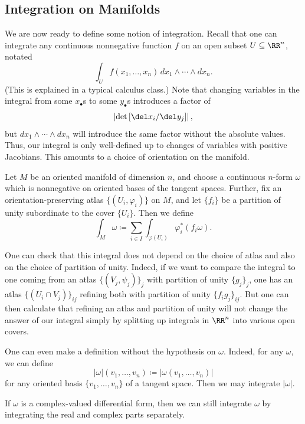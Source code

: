 \documentclass[../notes.tex]{subfiles}
\begin{document}
\subsection{Integration on Manifolds}
We are now ready to define some notion of integration. Recall that one can integrate any continuous nonnegative function $f$ on an open subset $U\subseteq\RR^n$, notated
\[\int_Uf(x_1,\ldots,x_n)\,dx_1\land\cdots\land dx_n.\]
(This is explained in a typical calculus class.) Note that changing variables in the integral from some $x_\bullet$s to some $y_\bullet$s introduces a factor of
\[\left|\det\left[\del x_i/\del y_j\right]\right|,\]
but $dx_1\land\cdots\land dx_n$ will introduce the same factor without the absolute values. Thus, our integral is only well-defined up to changes of variables with positive Jacobians. This amounts to a choice of orientation on the manifold.
\begin{definition}[integral]
	Let $M$ be an oriented manifold of dimension $n$, and choose a continuous $n$-form $\omega$ which is nonnegative on oriented bases of the tangent spaces. Further, fix an orientation-preserving atlas $\{(U_i,\varphi_i)\}$ on $M$, and let $\{f_i\}$ be a partition of unity subordinate to the cover $\{U_i\}$. Then we define
	\[\int_M\omega\coloneqq\sum_{i\in I}\int_{\varphi(U_i)}\varphi_i^*(f_i\omega).\]
\end{definition}
\begin{remark}
	One can check that this integral does not depend on the choice of atlas and also on the choice of partition of unity. Indeed, if we want to compare the integral to one coming from an atlas $\{(V_j,\psi_j)\}_j$ with partition of unity $\{g_j\}_j$, one has an atlas $\{(U_i\cap V_j)\}_{ij}$ refining both with partition of unity $\{f_ig_j\}_{ij}$. But one can then calculate that refining an atlas and partition of unity will not change the answer of our integral simply by splitting up integrals in $\RR^n$ into various open covers.
\end{remark}
\begin{remark}
	One can even make a definition without the hypothesis on $\omega$. Indeed, for any $\omega$, we can define
	\[\left|\omega\right|(v_1,\ldots,v_n)\coloneq\left|\omega(v_1,\ldots,v_n)\right|\]
	for any oriented basis $\{v_1,\ldots,v_n\}$ of a tangent space. Then we may integrate $\left|\omega\right|$.
\end{remark}
\begin{remark}
	If $\omega$ is a complex-valued differential form, then we can still integrate $\omega$ by integrating the real and complex parts separately.
\end{remark}
\end{document}
